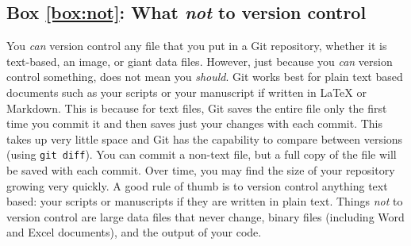 \label{box:not}
\subsection{Box \ref{box:not}: What \textit{not} to version control}

You \textit{can} version control any file that you put in a Git repository, whether it is text-based, an image, or giant data files. However, just because you \textit{can} version control something, does not mean you \textit{should}. Git works best for plain text based documents such as your scripts or your manuscript if written in LaTeX or Markdown. This is because for text files, Git saves the entire file only the first time you commit it and then saves just your changes with each commit. This takes up very little space and Git has the capability to compare between versions (using \verb|git diff|). You can commit a non-text file, but a full copy of the file will be saved with each commit. Over time, you may find the size of your repository growing very quickly. A good rule of thumb is to version control anything text based: your scripts or manuscripts if they are written in plain text. Things \textit{not} to version control are large data files that never change, binary files (including Word and Excel documents), and the output of your code. 
